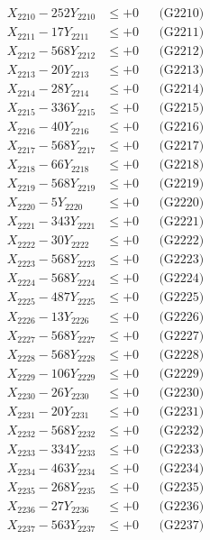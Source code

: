 \documentclass[a4paper,10pt]{article}
\begin{document}
{\begin{align}
X_{2210} - 252Y_{2210} &\leq +0 && \text{(G2210)} \\
\allowbreak
X_{2211} - 17Y_{2211} &\leq +0 && \text{(G2211)} \\
X_{2212} - 568Y_{2212} &\leq +0 && \text{(G2212)} \\
X_{2213} - 20Y_{2213} &\leq +0 && \text{(G2213)} \\
X_{2214} - 28Y_{2214} &\leq +0 && \text{(G2214)} \\
X_{2215} - 336Y_{2215} &\leq +0 && \text{(G2215)} \\
X_{2216} - 40Y_{2216} &\leq +0 && \text{(G2216)} \\
X_{2217} - 568Y_{2217} &\leq +0 && \text{(G2217)} \\
X_{2218} - 66Y_{2218} &\leq +0 && \text{(G2218)} \\
X_{2219} - 568Y_{2219} &\leq +0 && \text{(G2219)} \\
X_{2220} - 5Y_{2220} &\leq +0 && \text{(G2220)} \\
\allowbreak
X_{2221} - 343Y_{2221} &\leq +0 && \text{(G2221)} \\
X_{2222} - 30Y_{2222} &\leq +0 && \text{(G2222)} \\
X_{2223} - 568Y_{2223} &\leq +0 && \text{(G2223)} \\
X_{2224} - 568Y_{2224} &\leq +0 && \text{(G2224)} \\
X_{2225} - 487Y_{2225} &\leq +0 && \text{(G2225)} \\
X_{2226} - 13Y_{2226} &\leq +0 && \text{(G2226)} \\
X_{2227} - 568Y_{2227} &\leq +0 && \text{(G2227)} \\
X_{2228} - 568Y_{2228} &\leq +0 && \text{(G2228)} \\
X_{2229} - 106Y_{2229} &\leq +0 && \text{(G2229)} \\
X_{2230} - 26Y_{2230} &\leq +0 && \text{(G2230)} \\
\allowbreak
X_{2231} - 20Y_{2231} &\leq +0 && \text{(G2231)} \\
X_{2232} - 568Y_{2232} &\leq +0 && \text{(G2232)} \\
X_{2233} - 334Y_{2233} &\leq +0 && \text{(G2233)} \\
X_{2234} - 463Y_{2234} &\leq +0 && \text{(G2234)} \\
X_{2235} - 268Y_{2235} &\leq +0 && \text{(G2235)} \\
X_{2236} - 27Y_{2236} &\leq +0 && \text{(G2236)} \\
X_{2237} - 563Y_{2237} &\leq +0 && \text{(G2237)} \\

\end{align}}
\end{document}
